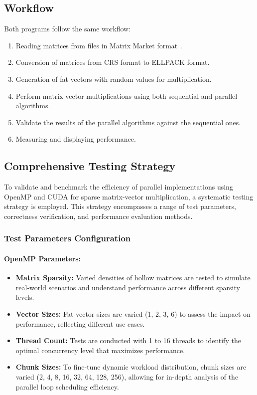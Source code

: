\documentclass[12pt,oneside]{book} %
\begin{document}
\subsection{Workflow}

Both programs follow the same workflow:

\begin{enumerate}
    \item Reading matrices from files in Matrix Market
          format~\cite{Davis2011UFCollection, Kolodziej2019SuiteSparseInterface}.
    \item Conversion of matrices from CRS format to ELLPACK format.
    \item Generation of fat vectors with random values for multiplication.
    \item Perform matrix-vector multiplications using both sequential and parallel
          algorithms.
    \item Validate the results of the parallel algorithms against the sequential ones.
    \item Measuring and displaying performance.
\end{enumerate}

\subsection{Comprehensive Testing Strategy}

To validate and benchmark the efficiency of parallel implementations using
OpenMP and CUDA for sparse matrix-vector multiplication, a systematic testing
strategy is employed. This strategy encompasses a range of test parameters,
correctness verification, and performance evaluation methods.

\subsubsection{Test Parameters Configuration}

\paragraph{OpenMP Parameters:}
\begin{itemize}
    \item \textbf{Matrix Sparsity:} Varied densities of hollow matrices are tested to simulate real-world scenarios and understand performance across different sparsity levels.
    \item \textbf{Vector Sizes:} Fat vector sizes are varied (1, 2, 3, 6) to assess the impact on performance, reflecting different use cases.
    \item \textbf{Thread Count:} Tests are conducted with 1 to 16 threads to identify the optimal concurrency level that maximizes performance.
    \item \textbf{Chunk Sizes:} To fine-tune dynamic workload distribution, chunk sizes are varied (2, 4, 8, 16, 32, 64, 128, 256), allowing for in-depth analysis of the parallel loop scheduling efficiency.
\end{itemize}
\end{document}

